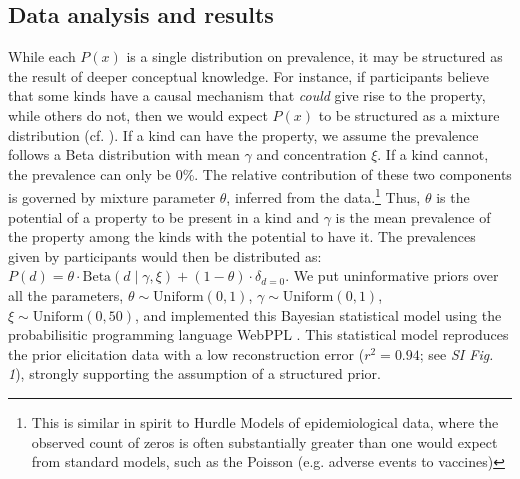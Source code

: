 \documentclass[12pt,letterpaper]{article}
\newcommand{\ndg}[1]{\textcolor{Green}{[ndg: #1]}}
\newcommand{\mht}[1]{\textcolor{Blue}{[mht: #1]}}
\begin{document}
\subsection*{Data analysis and results}
 
While each $P(x)$ is a single distribution on prevalence, it may be structured as the result of deeper conceptual knowledge. 
For instance, if participants believe that some kinds have a causal mechanism that \emph{could} give rise to the property, while others do not, then we would expect $P(x)$ to be structured as a mixture distribution (cf. ).
If a kind can have the property, we assume the prevalence follows a Beta distribution with mean $\gamma$ and concentration $\xi$. 
If a kind cannot, the prevalence can only be 0\%.
The relative contribution of these two components is governed by mixture parameter $\theta$, inferred from the data.\footnote{This is similar in spirit to Hurdle Models of epidemiological data, where the observed count of zeros is often substantially greater than one would expect from standard models, such as the Poisson (e.g. adverse events to vaccines)\cite{hurdleModels}}
Thus, $\theta$ is the potential of a property to be present in a kind and $\gamma$ is the mean prevalence of the property among the kinds with the potential to have it. The prevalences given by participants would then be distributed as: $P(d) = \theta \cdot \text{Beta}(d \mid \gamma,\xi)+ (1 - \theta) \cdot \delta_{d=0} $. 
We put uninformative priors over all the parameters, $\theta \sim \text{Uniform}(0,1)$, 
$\gamma \sim \text{Uniform}(0,1)$, $\xi \sim \text{Uniform}(0, 50)$, and implemented this Bayesian statistical model using the probabilisitic programming language WebPPL \cite{dippl}. This statistical model reproduces the prior elicitation data with a low reconstruction error ($r^2 = 0.94$; see {\it SI Fig. 1}), strongly supporting the assumption of a structured prior. 
\end{document}
